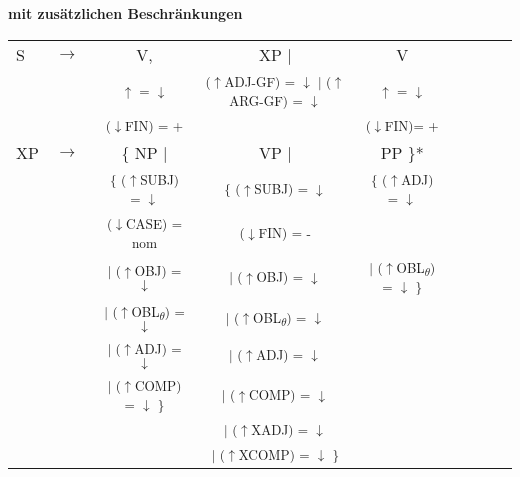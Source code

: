 \documentclass[12pt,a4paper]{article}
\begin{document}
\textbf{mit zusätzlichen Beschränkungen}
\begin{singlespace}
\begin{tabular}{ l  l  c  c  c  c  c  c  c}
S & $\rightarrow$ & V, & XP $\mid$ & V \\
   & $\qquad$ & \textsuperscript{$\uparrow$ = $\downarrow$} & \textsuperscript{($\uparrow$ADJ-GF) = $\downarrow$ $\mid$ ($\uparrow$ARG-GF) = $\downarrow$} &  \textsuperscript{$\uparrow$ = $\downarrow$} \\
      & $\qquad$ & \textsuperscript{($\downarrow$FIN) = +} & &  \textsuperscript{($\downarrow$FIN)= +} \\
XP & $\rightarrow$ & \{ NP $\mid$ &  VP $\mid$ & PP \}* \\
   & $\qquad$ & \textsuperscript{\{ ($\uparrow$SUBJ) = $\downarrow$} &\textsuperscript{\{ ($\uparrow$SUBJ) = $\downarrow$} & \textsuperscript{\{ ($\uparrow$ADJ) = $\downarrow$} \\
    & $\qquad$ & \textsuperscript{($\downarrow$CASE) = nom} & \textsuperscript{($\downarrow$FIN) = -} &  \\
    & $\qquad$ & \textsuperscript{$\mid$ ($\uparrow$OBJ) = $\downarrow$} & \textsuperscript{$\mid$ ($\uparrow$OBJ) = $\downarrow$} &  \textsuperscript{$\mid$ ($\uparrow$OBL\textsubscript{$\theta$}) = $\downarrow$ \}} \\
       & $\qquad$ & \textsuperscript{$\mid$ ($\uparrow$OBL\textsubscript{$\theta$}) = $\downarrow$} & \textsuperscript{$\mid$ ($\uparrow$OBL\textsubscript{$\theta$}) = $\downarrow$} & \\
         & $\qquad$ & \textsuperscript{$\mid$ ($\uparrow$ADJ) = $\downarrow$} & \textsuperscript{$\mid$ ($\uparrow$ADJ) = $\downarrow$} &  \\
           & $\qquad$ & \textsuperscript{$\mid$ ($\uparrow$COMP) = $\downarrow$ \}} & \textsuperscript{$\mid$ ($\uparrow$COMP) = $\downarrow$} &  \\
             & $\qquad$ & & \textsuperscript{$\mid$ ($\uparrow$XADJ) = $\downarrow$} &  \\
               & $\qquad$ & & \textsuperscript{$\mid$ ($\uparrow$XCOMP) = $\downarrow$ \} } &  \\

\end{tabular}
\end{singlespace}
\end{document}
